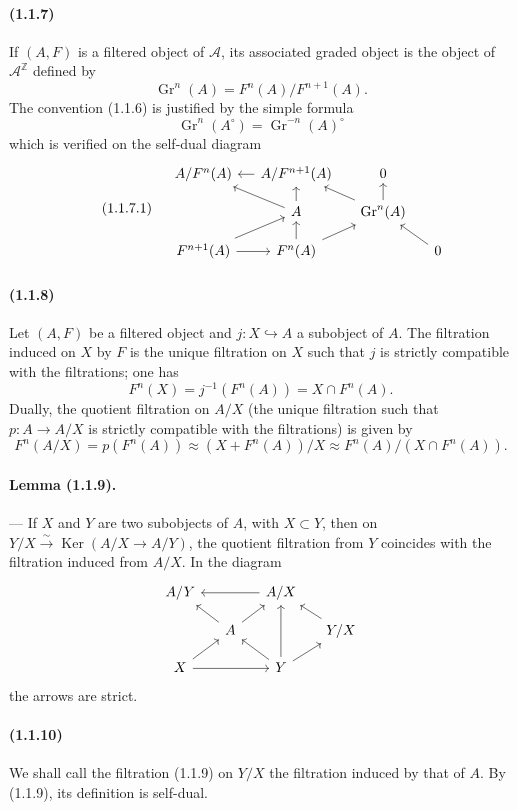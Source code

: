 \documentclass[10pt]{article}
\newcommand{\Z}{\mathbb Z}
\newcommand{\Gr}{\operatorname{Gr}}
\newcommand{\Ker}{\operatorname{Ker}}
\newcommand{\calA}{\mathcal A}
\newcommand{\iso}{\xrightarrow{\sim}}
\begin{document}
\paragraph{(1.1.7)} If $(A,F)$ is a filtered object of $\calA$, its associated graded object is the object of $\calA^{\Z}$ defined by
\[
\Gr^n(A)=F^n(A)/F^{n+1}(A).
\]
The convention (1.1.6) is justified by the simple formula
\[
\Gr^n(A^{\circ})=\Gr^{-n}(A)^{\circ}
\]
which is verified on the self-dual diagram
\begin{equation}\tag{1.1.7.1}
\begin{tikzcd}[column sep=1.2em,row sep=1.0em]
& A/F^n(A) & A/F^{n+1}(A) \arrow[l] & 0 \\
& & A \arrow[ul] \arrow[u] & \Gr^n(A) \arrow[ul] \arrow[u] \\
& F^{n+1}(A) \arrow[r] \arrow[ur] & F^n(A) \arrow[u] \arrow[ur] & & 0 \arrow[ul]
\end{tikzcd}
\end{equation}

\paragraph{(1.1.8)} Let $(A,F)$ be a filtered object and $j:X\hookrightarrow A$ a subobject of $A$. The filtration induced on $X$ by $F$ is the unique filtration on $X$ such that $j$ is strictly compatible with the filtrations; one has
\[
F^n(X)=j^{-1}(F^n(A))=X\cap F^n(A).
\]
Dually, the quotient filtration on $A/X$ (the unique filtration such that $p:A\to A/X$ is strictly compatible with the filtrations) is given by
\[
F^n(A/X)=p(F^n(A))\approx (X+F^n(A))/X\approx F^n(A)/(X\cap F^n(A)).
\]

\paragraph{Lemma (1.1.9).} --- If $X$ and $Y$ are two subobjects of $A$, with $X\subset Y$, then on $Y/X\iso\Ker(A/X\to A/Y)$, the quotient filtration from $Y$ coincides with the filtration induced from $A/X$. In the diagram
\[
\begin{tikzcd}[column sep=1.3em,row sep=1.0em]
A/Y && A/X \arrow[ll] & \\
& A \arrow[ul] \arrow[ur] && Y/X \arrow[ul] \\
X \arrow[ur] \arrow[rr] && Y \arrow[ul] \arrow[uu] \arrow[ur] &
\end{tikzcd}
\]
the arrows are strict.

\paragraph{(1.1.10)} We shall call the filtration (1.1.9) on $Y/X$ the filtration induced by that of $A$. By (1.1.9), its definition is self-dual.
\end{document}
